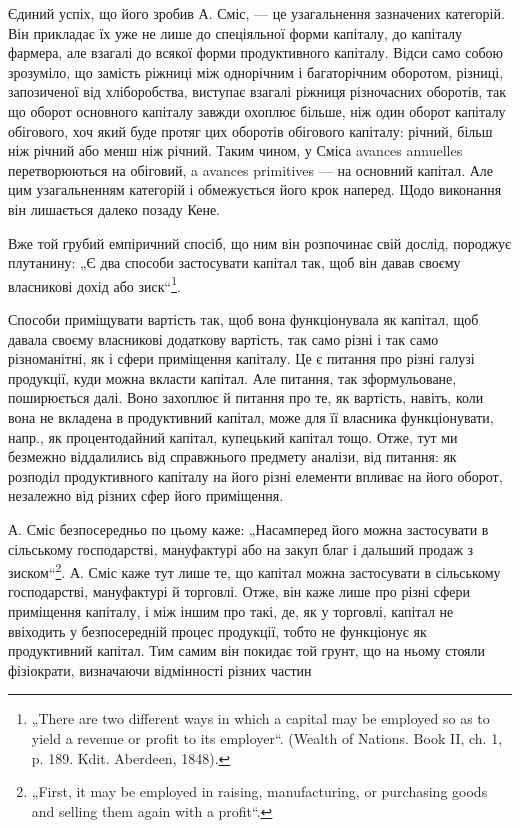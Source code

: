 Єдиний успіх, що його зробив А. Сміс, — це узагальнення зазначених
категорій. Він прикладає їх уже не лише до спеціяльної форми капіталу,
до капіталу фармера, але взагалі до всякої форми продуктивного капіталу.
Відси само собою зрозуміло, що замість ріжниці між однорічним і багаторічним
оборотом, різниці, запозиченої від хліборобства, виступає взагалі
ріжниця різночасних оборотів, так що оборот основного капіталу завжди
охоплює більше, ніж один оборот капіталу обігового, хоч який буде
протяг цих оборотів обігового капіталу: річний, більш ніж річний або
менш ніж річний. Таким чином, у Сміса avances annuelles перетворюються
на обіговий, a avances primitives — на основний капітал. Але цим узагальненням
категорій і обмежується його крок наперед. Щодо виконання він
лишається далеко позаду Кене.

Вже той грубий емпіричний спосіб, що ним він розпочинає свій дослід,
породжує плутанину: „Є два способи застосувати капітал так, щоб
він давав своєму власникові дохід або зиск“\footnote*{
„There are two different ways in which a capital may be employed so as to
yield a revenue or profit to its employer“. (Wealth of Nations. Book II, ch. 1, p. 189.
Kdit. Aberdeen, 1848).
}.

Способи приміщувати вартість так, щоб вона функціонувала як капітал,
щоб давала своєму власникові додаткову вартість, так само різні
і так само різноманітні, як і сфери приміщення капіталу. Це є питання
про різні галузі продукції, куди можна вкласти капітал. Але питання, так
зформульоване, поширюється далі. Воно захоплює й питання про те, як
вартість, навіть, коли вона не вкладена в продуктивний капітал, може для
її власника функціонувати, напр., як процентодайний капітал, купецький
капітал тощо. Отже, тут ми безмежно віддалились від справжнього предмету
аналізи, від питання: як розподіл продуктивного капіталу на
його різні елементи впливає на його оборот, незалежно від різних сфер
його приміщення.

А. Сміс безпосередньо по цьому каже: „Насамперед його можна застосувати
в сільському господарстві, мануфактурі або на закуп благ і дальший
продаж з зиском“\footnote*{
„First, it may be employed in raising, manufacturing, or purchasing goods and
selling them again with a profit“.
}. А. Сміс каже тут лише те, що капітал можна
застосувати в сільському господарстві, мануфактурі й торговлі. Отже, він
каже лише про різні сфери приміщення капіталу, і між іншим про такі, де,
як у торговлі, капітал не ввіходить у безпосередній процес продукції, тобто
не функціонує як продуктивний капітал. Тим самим він покидає той грунт,
що на ньому стояли фізіократи, визначаючи відмінності різних частин
\parbreak{}  %
